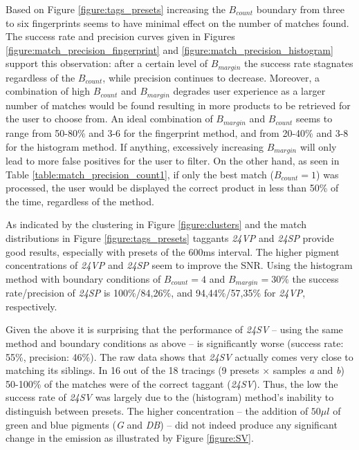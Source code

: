 \documentclass[thesis.tex]{subfiles}
\begin{document}
Based on Figure \ref{figure:tags_presets} increasing the $B_{count}$ boundary from three to six fingerprints seems to have minimal effect on the number of matches found. The success rate and precision curves given in Figures \ref{figure:match_precision_fingerprint} and \ref{figure:match_precision_histogram} support this observation: after a certain level of $B_{margin}$ the success rate stagnates regardless of the $B_{count}$, while precision continues to decrease. Moreover, a combination of high $B_{count}$ and $B_{margin}$ degrades user experience as a larger number of matches would be found resulting in more products to be retrieved for the user to choose from. An ideal combination of $B_{margin}$ and $B_{count}$ seems to range from 50-80\% and 3-6 for the fingerprint method, and from 20-40\% and 3-8 for the histogram method. If anything, excessively increasing $B_{margin}$ will only lead to more false positives for the user to filter. On the other hand, as seen in Table \ref{table:match_precision_count1}, if only the best match ($B_{count} = 1$) was processed, the user would be displayed the correct product in less than 50\% of the time, regardless of the method.

As indicated by the clustering in Figure \ref{figure:clusters} and the match distributions in Figure \ref{figure:tags_presets} taggants \emph{24VP} and \emph{24SP} provide good results, especially with presets of the 600ms interval. The higher pigment concentrations of \emph{24VP} and \emph{24SP} seem to improve the SNR. Using the histogram method with boundary conditions of $B_{count} = 4$ and $B_{margin} = 30\%$ the success rate/precision of \emph{24SP} is 100\%/84,26\%, and 94,44\%/57,35\% for \emph{24VP}, respectively.
\enlargethispage{1\baselineskip}

Given the above it is surprising that the performance of \emph{24SV} -- using the same method and boundary conditions as above -- is significantly worse (success rate: 55\%, precision: 46\%). The raw data shows that \emph{24SV} actually comes very close to matching its siblings. In 16 out of the 18 tracings (9 presets $\times$ samples \emph{a} and \emph{b}) 50-100\% of the matches were of the correct taggant (\emph{24SV}). Thus, the low the success rate of \emph{24SV} was largely due to the (histogram) method's inability to distinguish between presets. The higher concentration -- the addition of $50\mu l$ of green and blue pigments (\emph{G} and \emph{DB}) -- did not indeed produce any significant change in the emission as illustrated by Figure \ref{figure:SV}.
\end{document}
